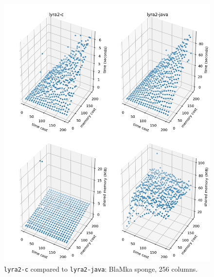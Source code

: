\begin{figure}[p]
    \centering
    \includegraphics[width=\linewidth,keepaspectratio]{figures/tcost_mcost_blamka_256}
    \caption{\texttt{lyra2-c} compared to \texttt{lyra2-java}: BlaMka sponge, 256 columns. }
    \label{figure:tcost_mcost_blamka_256}
\end{figure}

